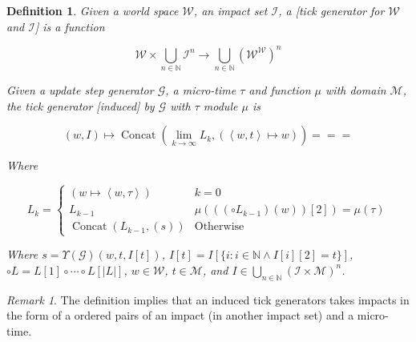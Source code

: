 \documentclass{book}
\newtheorem{definition}{Definition}
\theoremstyle{definition}\newtheorem{mechanism}{Mechanism}
\theoremstyle{remark}\newtheorem*{remark}{Remark}
\begin{document}
\begin{definition}
	Given a world space $\mathcal W$, an impact set $\mathcal I$, a [tick generator for $\mathcal W$ and $\mathcal I$] is a function
	
	\begin{equation*}
		\mathcal W \times \bigcup_{n \in \mathbb N} \mathcal I^n \to \bigcup_{n \in \mathbb N} \left(\mathcal W^{\mathcal W}\right)^n
	\end{equation*}
	
	Given a update step generator $\mathcal G$, a micro-time $\tau$ and function $\mu$ with domain $\mathcal M$, the tick generator [induced] by $\mathcal G$ with  $\tau$ module $\mu$ is
	
	\begin{equation*}
		(w, I) \mapsto \operatorname{Concat}\left(\lim_{k\to \infty} L_k, (\left<w, t\right> \mapsto w)\right)===
	\end{equation*}
	
	Where
	
	\begin{equation*}
		L_k = \begin{cases}
			(w \mapsto \left<w, \tau\right>) & k = 0\\
			L_{k - 1} & \mu(((\circ L_{k - 1})(w))[2]) = \mu(\tau)\\
			\operatorname{Concat}(L_{k - 1}, (s)) & \text{Otherwise}
		\end{cases}
	\end{equation*}
	
	Where $s = \Upsilon(\mathcal G)(w, t, I[t])$, $I[t] = I[\{i:i\in \mathbb N \land I[i][2] = t\}]$, $\circ L = L[1] \circ \cdots \circ L[|L|]$, $w\in \mathcal W$, $t\in \mathcal M$, and $I \in \bigcup_{n \in \mathbb N} \left(\mathcal I\times \mathcal M\right)^n$.
\end{definition}

\begin{remark}
	The definition implies that an induced tick generators takes impacts in the form of a ordered pairs of an impact (in another impact set) and a micro-time.
\end{remark}
\end{document}
